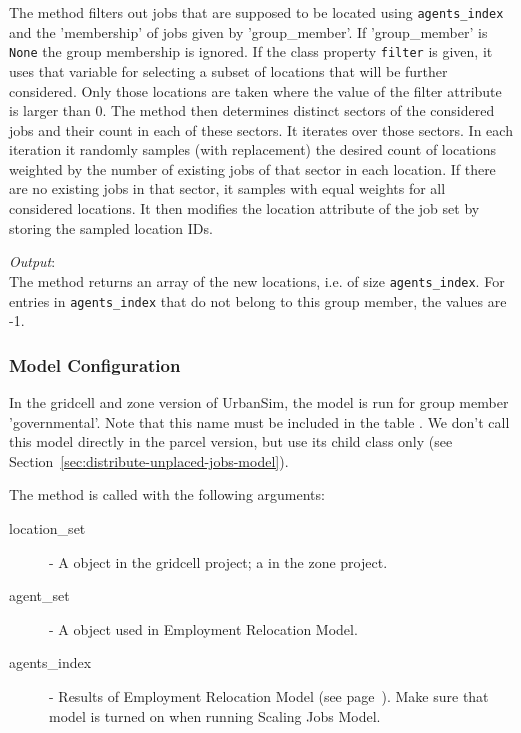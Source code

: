 The method filters out jobs that are supposed to be located using \verb|agents_index| and 
the 'membership' of jobs given by 'group_member'. If 'group_member' is \verb|None| the group membership is ignored.
If the class property \verb|filter| is given, it uses that variable for selecting a subset of
locations that will be further considered. Only those locations are taken where 
the value of the filter attribute is larger than 0. 
The method then determines distinct sectors of the considered jobs and their count in each of
these sectors. It iterates over those sectors. In each iteration it
randomly samples (with replacement) the desired count of locations
weighted by the number of existing jobs of that sector in each
location. If there are no existing jobs in that sector, it samples
with equal weights for all considered locations.  It then modifies the location
attribute of the job set by storing the sampled
location IDs.

{\it Output}:~\\[1mm]
The method returns an array of the new locations, i.e. of size
\verb|agents_index|. For entries in \verb|agents_index| that do not belong to this group member, the values are -1.

\subsubsection{Model Configuration}
%
In the gridcell and zone version of UrbanSim, the model is run for group member 'governmental'. Note that this name must be included
in the table . We don't call this model directly in the parcel version, but use its child class 
 only (see Section~\ref{sec:distribute-unplaced-jobs-model}).

The  method is called with
the following arguments:
\begin{description}
\item[location_set] - A  object in the gridcell project; a  in the zone project.
\item[agent_set] - A  object used in Employment Relocation
  Model.
\item[agents_index] - Results of Employment Relocation Model (see page~\pageref{page:ERM}).
Make sure that model is turned on 
when running Scaling Jobs Model.
\end{description}


